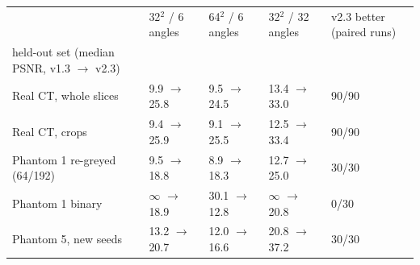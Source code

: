 \begin{tabular}{lllll}
\toprule
 & 32$^2$ / 6 angles & 64$^2$ / 6 angles & 32$^2$ / 32 angles & v2.3 better (paired runs) \\
held-out set (median PSNR, v1.3 $\to$ v2.3) &  &  &  &  \\
\midrule
Real CT, whole slices & 9.9 $\to$ 25.8 & 9.5 $\to$ 24.5 & 13.4 $\to$ 33.0 & 90/90 \\
Real CT, crops & 9.4 $\to$ 25.9 & 9.1 $\to$ 25.5 & 12.5 $\to$ 33.4 & 90/90 \\
Phantom 1 re-greyed (64/192) & 9.5 $\to$ 18.8 & 8.9 $\to$ 18.3 & 12.7 $\to$ 25.0 & 30/30 \\
Phantom 1 binary & $\infty$ $\to$ 18.9 & 30.1 $\to$ 12.8 & $\infty$ $\to$ 20.8 & 0/30 \\
Phantom 5, new seeds & 13.2 $\to$ 20.7 & 12.0 $\to$ 16.6 & 20.8 $\to$ 37.2 & 30/30 \\
\bottomrule
\end{tabular}
